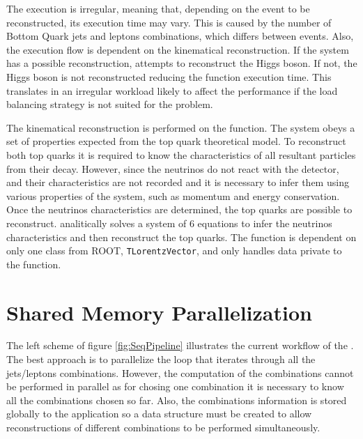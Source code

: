 The \ttDilepKinFit execution is irregular, meaning that, depending on the event to be reconstructed, its execution time may vary. This is caused by the number of Bottom Quark jets and leptons combinations, which differs between events. Also, the execution flow is dependent on the kinematical reconstruction. If the \ttbar system has a possible reconstruction, \ttDilepKinFit attempts to reconstruct the Higgs boson. If not, the Higgs boson is not reconstructed reducing the function execution time. This translates in an irregular workload likely to affect the performance if the load balancing strategy is not suited for the problem.

The kinematical reconstruction is performed on the \dilep function. The \ttbar system obeys a set of properties expected from the top quark theoretical model. To reconstruct both top quarks it is required to know the characteristics of all resultant particles from their decay. However, since the neutrinos do not react with the detector, and their characteristics are not recorded and it is necessary to infer them using various properties of the system, such as momentum and energy conservation. Once the neutrinos characteristics are determined, the top quarks are possible to reconstruct. \dilep analitically solves a system of 6 equations to infer the neutrinos characteristics and then reconstruct the top quarks. The function is dependent on only one class from ROOT, \texttt{TLorentzVector}, and only handles data private to the function.

\section{Shared Memory Parallelization}
\label{Parallelization:SharedMem}

The left scheme of figure \ref{fig:SeqPipeline} illustrates the current workflow of the \ttDilepKinFit. The best approach is to parallelize the loop that iterates through all the jets/leptons combinations. However, the computation of the combinations cannot be performed in parallel as for chosing one combination it is necessary to know all the combinations chosen so far. Also, the combinations information is stored globally to the application so a data structure must be created to allow reconstructions of different combinations to be performed simultaneously.


